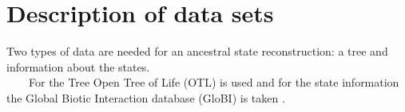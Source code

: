   \section{Description of data sets}
    Two types of data are needed for an ancestral state reconstruction: a tree and information about 
      the states. \\
    For the Tree Open Tree of Life (OTL) is used \cite{Hinchliff2015} and for the state information 
      the Global Biotic Interaction database (GloBI) is taken \cite{Poelen2014}. \\

